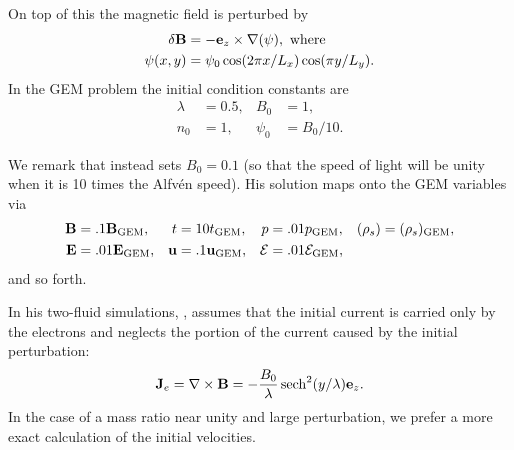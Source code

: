 \documentclass[12pt,fleqn]{article}
\numberwithin{equation}{section}
\begin{document}
On top of this the magnetic field is perturbed by
\begin{align*}
   \delta\mathbf{B}&=-\mathbf{e}_z\times\nabla(\psi), \hbox{ where}
\\ \psi(x,y)&=\psi_0 \cos(2\pi x/L_x) \cos(\pi y/L_y).
\end{align*}
In the GEM problem the initial condition constants are
\begin{align*}
    \lambda&=0.5,
  & B_0&=1,
 \\ n_0&=1,
  & \psi_0&=B_0/10.
\end{align*}

We remark that \cite{article:Hakim06} instead sets $B_0=0.1$
(so that the speed of light will be unity when it
is 10 times the Alfv\'en speed).
His solution maps onto the GEM variables via
\def\GEM{\mathrm{GEM}}
\def\u{\mathbf{u}}
\begin{align*}
   \B&=.1\B_\GEM,
 &  t&=10 t_\GEM,
 &  p&=.01 p_\GEM,
 & (\rho_s)=(\rho_s)_\GEM,
\\ \E&=.01\E_\GEM,
 & \u&=.1\u_\GEM,
 & \gasenergy&=.01 \gasenergy_\GEM,
\end{align*}
and so forth.

In his two-fluid simulations,
\cite{article:Hakim06}, assumes that the
initial current is carried only by the electrons
and neglects the portion of the current caused by the
initial perturbation:
\begin{gather*}
   \mathbf{J}_e = \nabla\times \mathbf{B} = -\frac{B_0}{\lambda}\,\mathrm{sech}^2(y/\lambda) \mathbf{e}_z.
\end{gather*}
In the case of a mass ratio near unity and large perturbation,
we prefer a more exact calculation of the initial velocities.
\end{document}
